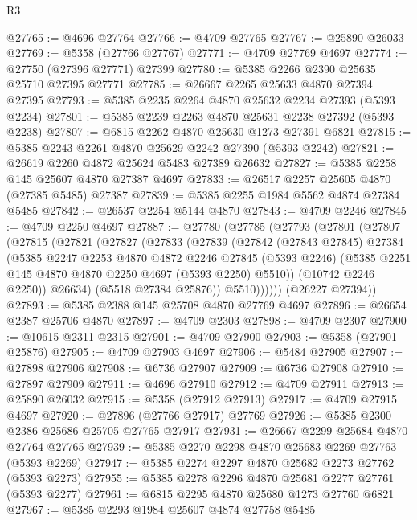 \begin{lexlean}{R3}
\begin{coremodule}
@27765 := @4696 @27764
@27766 := @4709 @27765
@27767 := @25890 @26033
@27769 := @5358 (@27766 @27767)
@27771 := @4709 @27769 @4697
@27774 := @27750 (@27396 @27771) @27399
@27780 := @5385 @2266 @2390 @25635 @25710 @27395 @27771
@27785 := @26667 @2265 @25633 @4870 @27394 @27395
@27793 := @5385 @2235 @2264 @4870 @25632 @2234 @27393 (@5393 @2234)
@27801 := @5385 @2239 @2263 @4870 @25631 @2238 @27392 (@5393 @2238)
@27807 := @6815 @2262 @4870 @25630 @1273 @27391 @6821
@27815 := @5385 @2243 @2261 @4870 @25629 @2242 @27390 (@5393 @2242)
@27821 := @26619 @2260 @4872 @25624 @5483 @27389 @26632
@27827 := @5385 @2258 @145 @25607 @4870 @27387 @4697
@27833 := @26517 @2257 @25605 @4870 (@27385 @5485) @27387
@27839 := @5385 @2255 @1984 @5562 @4874 @27384 @5485
@27842 := @26537 @2254 @5144 @4870
@27843 := @4709 @2246
@27845 := @4709 @2250 @4697
@27887 := @27780
    (@27785
      (@27793
        (@27801
          (@27807
            (@27815
              (@27821
                (@27827
                  (@27833
                    (@27839
                      (@27842
                        (@27843 @27845)
                        @27384
                        (@5385
                          @2247
                          @2253
                          @4870
                          @4872
                          @2246
                          @27845
                          (@5393 @2246)
                          (@5385 @2251 @145 @4870 @4870 @2250 @4697 (@5393 @2250) @5510))
                        (@10742 @2246 @2250))
                      @26634)
                    (@5518 @27384 @25876))
                  @5510))))))
      (@26227 @27394))
@27893 := @5385 @2388 @145 @25708 @4870 @27769 @4697
@27896 := @26654 @2387 @25706 @4870
@27897 := @4709 @2303
@27898 := @4709 @2307
@27900 := @10615 @2311 @2315
@27901 := @4709 @27900
@27903 := @5358 (@27901 @25876)
@27905 := @4709 @27903 @4697
@27906 := @5484 @27905
@27907 := @27898 @27906
@27908 := @6736 @27907
@27909 := @6736 @27908
@27910 := @27897 @27909
@27911 := @4696 @27910
@27912 := @4709 @27911
@27913 := @25890 @26032
@27915 := @5358 (@27912 @27913)
@27917 := @4709 @27915 @4697
@27920 := @27896 (@27766 @27917) @27769
@27926 := @5385 @2300 @2386 @25686 @25705 @27765 @27917
@27931 := @26667 @2299 @25684 @4870 @27764 @27765
@27939 := @5385 @2270 @2298 @4870 @25683 @2269 @27763 (@5393 @2269)
@27947 := @5385 @2274 @2297 @4870 @25682 @2273 @27762 (@5393 @2273)
@27955 := @5385 @2278 @2296 @4870 @25681 @2277 @27761 (@5393 @2277)
@27961 := @6815 @2295 @4870 @25680 @1273 @27760 @6821
@27967 := @5385 @2293 @1984 @25607 @4874 @27758 @5485

\end{coremodule}
\end{lexlean}
